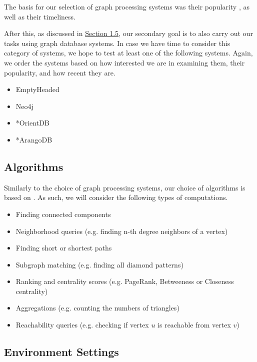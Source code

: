 \documentclass[a4paper,11pt]{article}
\begin{document}
\par The basis for our selection of graph processing systems was their popularity \cite{survey}, as well as their timeliness.

\par After this, as discussed in \hyperref[feasibility]{Section 1.5}, our secondary goal is to also carry out our tasks using graph database systems. In case we have time to consider this category of systems, we hope to test at least one of the following systems. Again, we order the systems based on how interested we are in examining them, their popularity, and how recent they are.

\begin{itemize}

	\item EmptyHeaded \cite{emptyheaded,emptyheadedgit}
	\item Neo4j \cite{neo4j}
	\item *OrientDB \cite{orientdb}
	\item *ArangoDB \cite{arangodb}

\end{itemize}

\subsection{Algorithms} \label{algos}

\par Similarly to the choice of graph processing systems, our choice of algorithms is based on  \cite{survey}. As such, we will consider the following types of computations.

\begin{itemize}
	\item Finding connected components
	\item Neighborhood queries (e.g. finding n-th degree neighbors of a vertex)
	\item Finding short or shortest paths
	\item Subgraph matching (e.g. finding all diamond patterns)
	\item Ranking and centrality scores (e.g. PageRank, Betweeness or Closeness centrality)
	\item Aggregations (e.g. counting the numbers of triangles)
	\item Reachability queries (e.g. checking if vertex $u$ is reachable from vertex $v$)
\end{itemize}

\subsection{Environment Settings}
\end{document}
